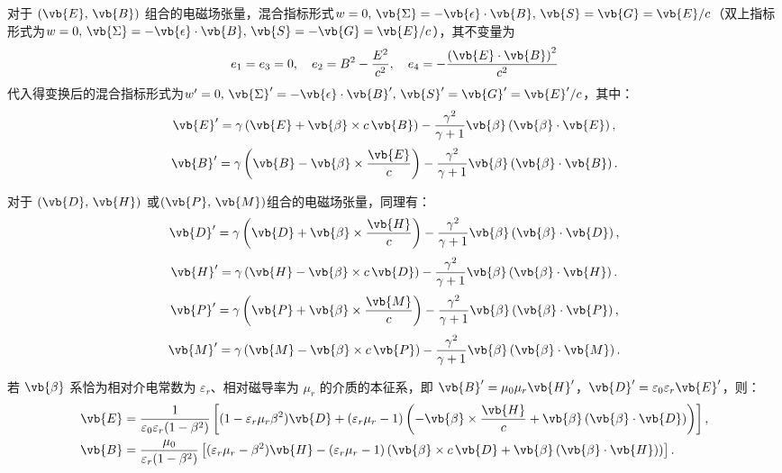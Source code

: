 \begin{example}
	对于 \((\vb{E}, \, \vb{B})\) 组合的电磁场张量，混合指标形式\(w = 0,\,\vb{\Sigma} = -\vb{\epsilon} \cdot \vb{B},\,\vb{S} = \vb{G} = \vb{E}/c\)（双上指标形式为\(w = 0,\,\vb{\Sigma} =- \vb{\epsilon} \cdot \vb{B},\,\vb{S} = -\vb{G} = \vb{E}/c\)），其不变量为
	\begin{equation*}
		e_1=e_3=0,\quad e_2=B^2-\frac{E^2}{c^2},\quad e_4=-\frac{\left(\vb{E}\cdot\vb{B}\right)^2}{c^2}
	\end{equation*}
	代入得变换后的混合指标形式为\(w' = 0,\,\vb{\Sigma}' =- \vb{\epsilon} \cdot \vb{B}',\,\vb{S}' = \vb{G}' = \vb{E}'/c\)，其中：
	\begin{equation*}
		\vb{E}' = \gamma \left( \vb{E} + \vb{\beta} \times c \, \vb{B} \right) - \dfrac{\gamma^2}{\gamma + 1} \vb{\beta} \left( \vb{\beta} \cdot \vb{E} \right),
	\end{equation*}
	\begin{equation*}
		\vb{B}' = \gamma \left( \vb{B} - \vb{\beta} \times \dfrac{\vb{E}}{c} \right) - \dfrac{\gamma^2}{\gamma + 1} \vb{\beta} \left( \vb{\beta} \cdot \vb{B} \right).
	\end{equation*}

	对于 \((\vb{D}, \, \vb{H})\) 或\((\vb{P}, \, \vb{M})\)组合的电磁场张量，同理有：
	\begin{equation*}
		\vb{D}' = \gamma \left( \vb{D} + \vb{\beta} \times \dfrac{\vb{H}}{c} \right) - \dfrac{\gamma^2}{\gamma + 1} \vb{\beta} \left( \vb{\beta} \cdot \vb{D} \right),
	\end{equation*}
	\begin{equation*}
		\vb{H}' = \gamma \left( \vb{H} - \vb{\beta} \times c \, \vb{D} \right) - \dfrac{\gamma^2}{\gamma + 1} \vb{\beta} \left( \vb{\beta} \cdot \vb{H} \right).
	\end{equation*}
	\begin{equation*}
		\vb{P}' = \gamma \left( \vb{P} + \vb{\beta} \times \dfrac{\vb{M}}{c} \right) - \dfrac{\gamma^2}{\gamma + 1} \vb{\beta} \left( \vb{\beta} \cdot \vb{P} \right),
	\end{equation*}
	\begin{equation*}
		\vb{M}' = \gamma \left( \vb{M} - \vb{\beta} \times c \, \vb{P} \right) - \dfrac{\gamma^2}{\gamma + 1} \vb{\beta} \left( \vb{\beta} \cdot \vb{M} \right).
	\end{equation*}

	若 \(\vb{\beta}\) 系恰为相对介电常数为 \(\varepsilon_r\)、相对磁导率为 \(\mu_r\) 的介质的本征系，即 \(\vb{B}' = \mu_0 \mu_r \vb{H}'\)，\(\vb{D}' = \varepsilon_0 \varepsilon_r \vb{E}'\)，则：
	\begin{align*}
		\vb{E} & = \dfrac{1}{\varepsilon_0 \varepsilon_r (1 - \beta^2)} \left[ (1 - \varepsilon_r \mu_r \beta^2) \vb{D} + (\varepsilon_r \mu_r - 1) \left( -\vb{\beta} \times \dfrac{\vb{H}}{c} + \vb{\beta} \left( \vb{\beta} \cdot \vb{D} \right) \right) \right], \\
		\vb{B} & = \dfrac{\mu_0}{\varepsilon_r (1 - \beta^2)} \left[ (\varepsilon_r \mu_r - \beta^2) \vb{H} - (\varepsilon_r \mu_r - 1) \left( \vb{\beta} \times c \, \vb{D} + \vb{\beta} \left( \vb{\beta} \cdot \vb{H} \right) \right) \right].
	\end{align*}
\end{example}

